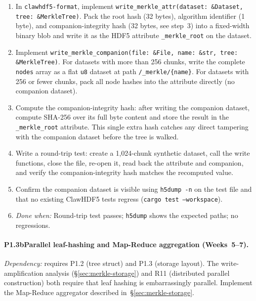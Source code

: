 \documentclass[11pt]{article}
\begin{document}
\begin{enumerate}[nosep]
  \item In \texttt{clawhdf5-format}, implement
    \texttt{write\_merkle\_attr(dataset: \&Dataset, tree: \&MerkleTree)}.
    Pack the root hash (32 bytes), algorithm identifier (1 byte), and
    companion-integrity hash (32 bytes, see step~3) into a fixed-width binary
    blob and write it as the HDF5 attribute \texttt{\_merkle\_root} on the
    dataset.
  \item Implement \texttt{write\_merkle\_companion(file: \&File, name: \&str,
    tree: \&MerkleTree)}. For datasets with more than 256 chunks, write the
    complete \texttt{nodes} array as a flat \texttt{u8} dataset at path
    \texttt{/\_merkle/\{name\}}. For datasets with 256 or fewer chunks,
    pack all node hashes into the attribute directly (no companion dataset).
  \item Compute the companion-integrity hash: after writing the companion
    dataset, compute SHA-256 over its full byte content and store the result
    in the \texttt{\_merkle\_root} attribute. This single extra hash catches
    any direct tampering with the companion dataset before the tree is walked.
  \item Write a round-trip test: create a 1,024-chunk synthetic dataset, call
    the write functions, close the file, re-open it, read back the attribute
    and companion, and verify the companion-integrity hash matches the
    recomputed value.
  \item Confirm the companion dataset is visible using
    \texttt{h5dump -n} on the test file and that no existing ClawHDF5 tests
    regress (\texttt{cargo test --workspace}).
  \item \emph{Done when:} Round-trip test passes; \texttt{h5dump} shows the
    expected paths; no regressions.
\end{enumerate}

\paragraph{P1.3b\enspace Parallel leaf-hashing and Map-Reduce aggregation
(Weeks~5--7).}
\textit{Dependency:} requires P1.2 (tree struct) and P1.3 (storage layout).
The write-amplification analysis (\S\ref{sec:merkle-storage}) and R11
(distributed parallel construction) both require that leaf hashing is
embarrassingly parallel. Implement the Map-Reduce aggregator described
in~\S\ref{sec:merkle-storage}.
\end{document}
